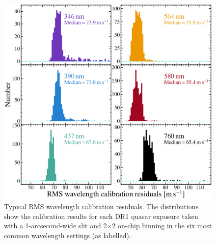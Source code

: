\documentclass[fleqn,usenatbib,usedcolumn]{mnras}
\begin{document}
\begin{figure}
\begin{center}
\includegraphics[width=0.90\columnwidth]{DR1_wavcalrms_1p0_2x2.pdf}
\vspace{-1em}
\caption{Typical RMS wavelength calibration residuals. The distributions show the calibration results for each DR1 quasar exposure taken with a 1-arcsecond-wide slit and 2$\times$2 on-chip binning in the six most common wavelength settings (as labelled).}
\label{f:wavcal}
\end{center}
\end{figure}
\end{document}
